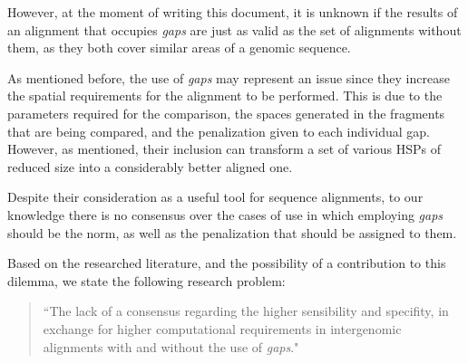 \medskip

However, at the moment of writing this document, it is unknown if the results of an alignment that occupies \textit{gaps} are just as valid as the set of alignments without them, as they both cover similar areas of a genomic sequence. 

\medskip

As mentioned before, the use of \textit{gaps} may represent an issue since they increase the spatial requirements for the alignment to be performed. This is due to the parameters required for the comparison, the spaces generated in the fragments that are being compared, and the penalization given to each individual gap. However, as mentioned, their inclusion can transform a set of various HSPs of reduced size into a considerably better aligned one. 

\medskip

Despite their consideration as a useful tool for sequence alignments, to our knowledge there is no consensus over the cases of use in which employing \textit{gaps} should be the norm, as well as the penalization that should be assigned to them.

\medskip

Based on the researched literature, and the possibility of a contribution to this dilemma, we state the following research problem:

\begin{quote}
  ``The lack of a consensus regarding the higher sensibility and specifity, in exchange for higher computational requirements in intergenomic alignments with and without the use of \textit{gaps}."
\end{quote}